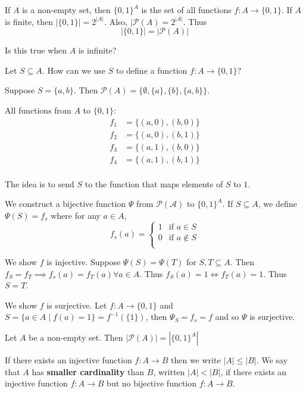 \documentclass{article}
\begin{document}
    \begin{remark}
      If $A$ is a non-empty set, then $\{0, 1\}^A$ is the set of all functions $f: A \to \{0, 1\}$. If $A$ is finite, then $|\{0, 1\}| = 2^{|A|}$. Also, $|\mathcal{P}(A) = 2^{|A|}$. Thus \[
        |\{0, 1\}| = |\mathcal{P}(A)|
      \]

      Is this true when $A$ is infinite?

      Let $S \subseteq A$. How can we use $S$ to define a function $f: A \to \{0, 1\}$?

      Suppose $S = \{a, b\}$. Then $\mathcal{P}(A) = \{\emptyset, \{a\}, \{b\}, \{a, b\}\}$.

      All functions from $A$ to $\{0, 1\}$:
      \begin{align*}
        f_1 &= \{(a, 0), (b, 0)\}\\
        f_2 &= \{(a, 0), (b, 1)\}\\
        f_3 &= \{(a, 1), (b, 0)\}\\
        f_4 &= \{(a, 1), (b, 1)\}\\
      \end{align*}

      The idea is to send $S$ to the function that maps elements of $S$ to $1$.

      We construct a bijective function $\Psi$ from $\mathcal{P(A)}$ to $\{0, 1\}^A$. If $S \subseteq A$, we define $\Psi(S) = f_s$ where for any $a \in A$, \[
        f_s(a) =
        \begin{cases}
          1 &\text{if }a \in S\\
          0 &\text{if }a \not\in S\\
        \end{cases}
      \]

      We show $f$ is injective.
      Suppose $\Psi(S) = \Psi(T)$ for $S, T \subseteq A$. Then $f_S = f_T \implies f_s(a) = f_T(a) \forall a \in A$. Thus $f_S(a) = 1 \iff f_T(a) = 1$. Thus $S = T$.

      We show $f$ is surjective.
      Let $f: A \to \{0, 1\}$ and $S = \{a \in A \mid f(a) = 1\} = f^{-1}(\{1\})$, then $\Psi_S = f_s = f$ and so $\Psi$ is surjective.
    \end{remark}
    \begin{theorem}
      Let $A$ be a non-empty set. Then $|\mathcal{P}(A)| = |\{0, 1\}^A|$
    \end{theorem}
    \begin{definition}
      If there exists an injective function $f: A \to B$ then we write $|A| \leq |B|$. We say that $A$ has \textbf{smaller cardinality} than $B$, written $|A| < |B|$, if there exists an injective function $f: A \to B$ but no bijective function $f: A \to B$.
    \end{definition}
\end{document}
